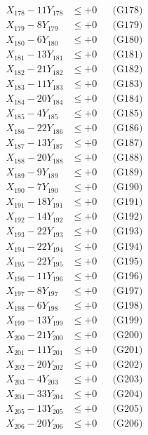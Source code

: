 \documentclass[a4paper,10pt]{article}
\begin{document}
{\begin{align}
\allowbreak
X_{178} - 11Y_{178} &\leq +0 && \text{(G178)} \\
X_{179} - 8Y_{179} &\leq +0 && \text{(G179)} \\
X_{180} - 6Y_{180} &\leq +0 && \text{(G180)} \\
X_{181} - 13Y_{181} &\leq +0 && \text{(G181)} \\
X_{182} - 21Y_{182} &\leq +0 && \text{(G182)} \\
X_{183} - 11Y_{183} &\leq +0 && \text{(G183)} \\
X_{184} - 20Y_{184} &\leq +0 && \text{(G184)} \\
X_{185} - 4Y_{185} &\leq +0 && \text{(G185)} \\
X_{186} - 22Y_{186} &\leq +0 && \text{(G186)} \\
X_{187} - 13Y_{187} &\leq +0 && \text{(G187)} \\
\allowbreak
X_{188} - 20Y_{188} &\leq +0 && \text{(G188)} \\
X_{189} - 9Y_{189} &\leq +0 && \text{(G189)} \\
X_{190} - 7Y_{190} &\leq +0 && \text{(G190)} \\
X_{191} - 18Y_{191} &\leq +0 && \text{(G191)} \\
X_{192} - 14Y_{192} &\leq +0 && \text{(G192)} \\
X_{193} - 22Y_{193} &\leq +0 && \text{(G193)} \\
X_{194} - 22Y_{194} &\leq +0 && \text{(G194)} \\
X_{195} - 22Y_{195} &\leq +0 && \text{(G195)} \\
X_{196} - 11Y_{196} &\leq +0 && \text{(G196)} \\
X_{197} - 8Y_{197} &\leq +0 && \text{(G197)} \\
\allowbreak
X_{198} - 6Y_{198} &\leq +0 && \text{(G198)} \\
X_{199} - 13Y_{199} &\leq +0 && \text{(G199)} \\
X_{200} - 21Y_{200} &\leq +0 && \text{(G200)} \\
X_{201} - 11Y_{201} &\leq +0 && \text{(G201)} \\
X_{202} - 20Y_{202} &\leq +0 && \text{(G202)} \\
X_{203} - 4Y_{203} &\leq +0 && \text{(G203)} \\
X_{204} - 33Y_{204} &\leq +0 && \text{(G204)} \\
X_{205} - 13Y_{205} &\leq +0 && \text{(G205)} \\
X_{206} - 20Y_{206} &\leq +0 && \text{(G206)} \\

\end{align}}
\end{document}
